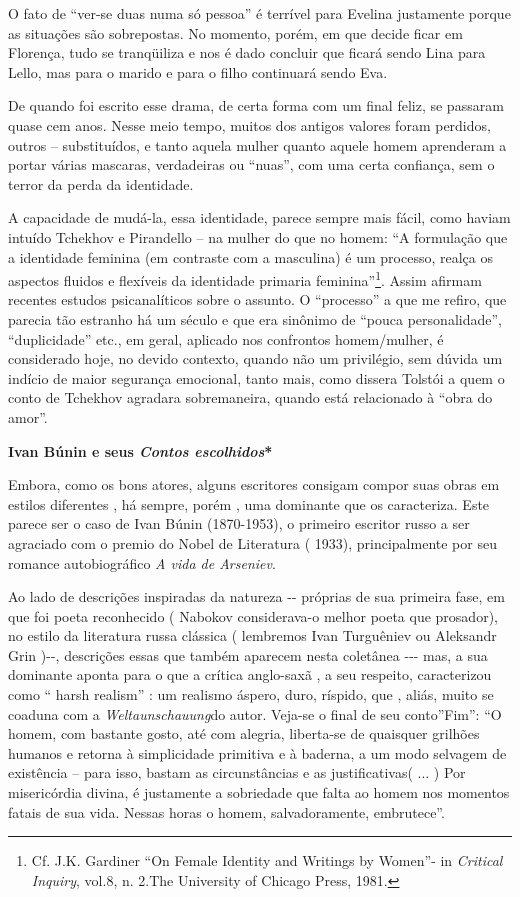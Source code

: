 O fato de ``ver-se duas numa só pessoa'' é terrível para Evelina
justamente porque as situações são sobrepostas. No momento, porém, em
que decide ficar em Florença, tudo se tranqüiliza e nos é dado concluir
que ficará sendo Lina para Lello, mas para o marido e para o filho
continuará sendo Eva.

De quando foi escrito esse drama, de certa forma com um final feliz, se
passaram quase cem anos. Nesse meio tempo, muitos dos antigos valores
foram perdidos, outros -- substituídos, e tanto aquela mulher quanto
aquele homem aprenderam a portar várias mascaras, verdadeiras ou
``nuas'', com uma certa confiança, sem o terror da perda da identidade.

A capacidade de mudá-la, essa identidade, parece sempre mais fácil, como
haviam intuído Tchekhov e Pirandello -- na mulher do que no homem: ``A
formulação que a identidade feminina (em contraste com a masculina) é um
processo, realça os aspectos fluidos e flexíveis da identidade primaria
feminina''\footnote{Cf. J.K. Gardiner ``On Female Identity and Writings
  by Women''- in \emph{Critical Inquiry}, vol.8, n. 2.The University of
  Chicago Press, 1981.}. Assim afirmam recentes estudos psicanalíticos
sobre o assunto. O ``processo'' a que me refiro, que parecia tão
estranho há um século e que era sinônimo de ``pouca personalidade'',
``duplicidade'' etc., em geral, aplicado nos confrontos homem/mulher, é
considerado hoje, no devido contexto, quando não um privilégio, sem
dúvida um indício de maior segurança emocional, tanto mais, como dissera
Tolstói a quem o conto de Tchekhov agradara sobremaneira, quando está
relacionado à ``obra do amor''.

\protect\hypertarget{__DdeLink__16887_1485881000}{}{}\textbf{Ivan Búnin
e seus \emph{Contos escolhidos}*}

\protect\hypertarget{__DdeLink__16893_1485881000}{}{}Embora, como os
bons atores, alguns escritores consigam compor suas obras em estilos
diferentes , há sempre, porém , uma dominante que os caracteriza. Este
parece ser o caso de Ivan Búnin (1870-1953), o primeiro escritor russo a
ser agraciado com o premio do Nobel de Literatura ( 1933),
principalmente por seu romance autobiográfico \emph{A vida de Arseniev}.

\protect\hypertarget{__DdeLink__16883_1485881000}{}{}Ao lado de
descrições inspiradas da natureza -\/- próprias de sua primeira fase, em
que foi poeta reconhecido ( Nabokov considerava-o melhor poeta que
prosador), no estilo da literatura russa clássica ( lembremos Ivan
Turguêniev ou Aleksandr Grin )-\/-, descrições essas que também aparecem
nesta coletânea -\/-\/- mas, a sua dominante aponta para o que a crítica
anglo-saxã , a seu respeito, caracterizou como `` harsh realism'' : um
realismo áspero, duro, ríspido, que , aliás, muito se coaduna com a
\emph{Weltaunschauung}do autor. Veja-se o final de seu conto''Fim'': ``O
homem, com bastante gosto, até com alegria, liberta-se de quaisquer
grilhões humanos e retorna à simplicidade primitiva e à baderna, a um
modo selvagem de existência -- para isso, bastam as circunstâncias e as
justificativas( ... ) Por misericórdia divina, é justamente a sobriedade
que falta ao homem nos momentos fatais de sua vida. Nessas horas o
homem, salvadoramente, embrutece''.

